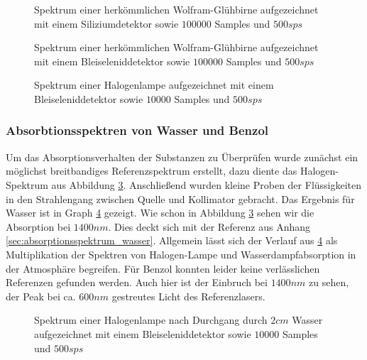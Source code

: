 			\begin{figure}[htb]
				\centering
				
				\caption{Spektrum einer herkömmlichen Wolfram-Glühbirne aufgezeichnet mit einem Siliziumdetektor 
				sowie $100000$ Samples und $500 \unit{sps}$}
				\label{fig:lamp-si}
			\end{figure}

			\begin{figure}[htb]
				\centering
				
				\caption{Spektrum einer herkömmlichen Wolfram-Glühbirne aufgezeichnet mit einem Bleiseleniddetektor 
				sowie $100000$ Samples und $500 \unit{sps}$}
				\label{fig:lamp-pbse}
			\end{figure}

			\begin{figure}[htb]
				\centering
				
				\caption{Spektrum einer Halogenlampe aufgezeichnet mit einem Bleiseleniddetektor 
				sowie $10000$ Samples und $500 \unit{sps}$}
				\label{fig:halo-pbse}
			\end{figure}
		
	
		\subsubsection{Absorbtionsspektren von Wasser und Benzol} %
		\label{ssub:absorbtionsspektren_von_wasser_und_benzol}

			Um das Absorptionsverhalten der Substanzen zu Überprüfen wurde zunächst ein möglichst breitbandiges Referenzspektrum erstellt, dazu diente das Halogen-Spektrum aus Abbildung \ref{fig:halo-pbse}.
			Anschließend wurden kleine Proben der Flüssigkeiten in den Strahlengang zwischen Quelle und Kollimator gebracht.
			Das Ergebnis für Wasser ist in Graph \ref{fig:die Henne} gezeigt.
			Wie schon in Abbildung \ref{fig:halo-pbse} sehen wir die Absorption bei $1400 \unit{nm}$.
			Dies deckt sich mit der Referenz aus Anhang \ref{sec:absorptionsspektrum_wasser}.
			Allgemein lässt sich der Verlauf aus \ref{fig:die Henne} als Multiplikation der Spektren von Halogen-Lampe und Wasserdampfabsorption in der Atmosphäre begreifen.
			Für Benzol konnten leider keine verlässlichen Referenzen gefunden werden.
			Auch hier ist der Einbruch bei $1400 \unit{nm}$ zu sehen, der Peak bei ca. $600 \unit{nm}$ gestreutes Licht des Referenzlasers.

			\begin{figure}[htb]
				\centering
				
				\caption{Spektrum einer Halogenlampe nach Durchgang durch $2 \unit{cm}$ Wasser aufgezeichnet mit einem Bleiseleniddetektor 
				sowie $10000$ Samples und $500 \unit{sps}$}
				\label{fig:die Henne}
			\end{figure}
		
